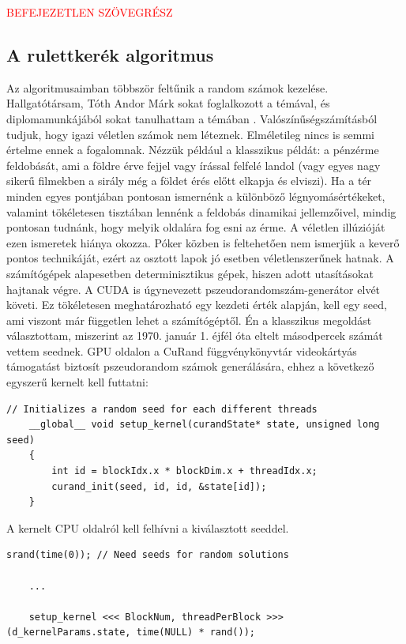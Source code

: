 \textcolor{red}{BEFEJEZETLEN SZÖVEGRÉSZ}

\subsection{A rulettkerék algoritmus }
Az algoritmusaimban többször feltűnik a random számok kezelése. Hallgatótársam, Tóth Andor Márk sokat foglalkozott a témával, és diplomamunkájából sokat tanulhattam a témában \cite{alg_optim}. Valószínűségszámításból tudjuk, hogy igazi véletlen számok nem léteznek. Elméletileg nincs is semmi értelme ennek a fogalomnak. Nézzük például a klasszikus példát: a pénzérme feldobását, ami a földre érve fejjel vagy írással felfelé landol (vagy egyes nagy sikerű filmekben a sirály még a földet érés előtt elkapja és elviszi). Ha a tér minden egyes pontjában pontosan ismernénk a különböző légnyomásértékeket, valamint tökéletesen tisztában lennénk a feldobás dinamikai jellemzőivel, mindig pontosan tudnánk, hogy melyik oldalára fog esni az érme. A véletlen illúzióját ezen ismeretek hiánya okozza. Póker közben is feltehetően nem ismerjük a keverő pontos technikáját, ezért az osztott lapok jó esetben véletlenszerűnek hatnak. A számítógépek alapesetben determinisztikus gépek, hiszen adott utasításokat hajtanak végre. 
A CUDA is úgynevezett pszeudorandomszám-generátor elvét követi. Ez tökéletesen meghatározható egy kezdeti érték alapján, kell egy seed, ami viszont már független lehet a számítógéptől. Én a klasszikus megoldást választottam, miszerint az 1970. január 1. éjfél óta eltelt másodpercek számát vettem seednek.
GPU oldalon a CuRand függvénykönyvtár videokártyás támogatást biztosít pszeudorandom számok generálására, ehhez a következő egyszerű kernelt kell futtatni:

\begin{lstlisting}[style=CStyle]
	// Initializes a random seed for each different threads
	__global__ void setup_kernel(curandState* state, unsigned long seed)
	{
		int id = blockIdx.x * blockDim.x + threadIdx.x;
		curand_init(seed, id, id, &state[id]);
	}
\end{lstlisting}

A kernelt CPU oldalról kell felhívni a kiválasztott seeddel.

\begin{lstlisting}[style=CStyle]
	srand(time(0)); // Need seeds for random solutions
	
	...
	
	setup_kernel <<< BlockNum, threadPerBlock >>> (d_kernelParams.state, time(NULL) * rand());
\end{lstlisting}

